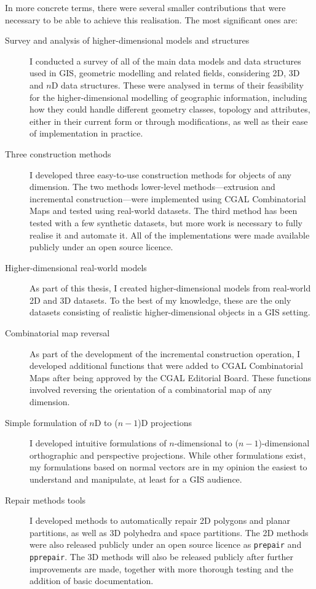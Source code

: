 In more concrete terms, there were several smaller contributions that were necessary to be able to achieve this realisation.
The most significant ones are:

\begin{description}

\item[Survey and analysis of higher-dimensional models and structures] I conducted a survey of all of the main data models and data structures used in GIS, geometric modelling and related fields, considering 2D, 3D and $n$D data structures.
These were analysed in terms of their feasibility for the higher-dimensional modelling of geographic information, including how they could handle different geometry classes, topology and attributes, either in their current form or through modifications, as well as their ease of implementation in practice.

\item[Three construction methods] I developed three easy-to-use construction methods for objects of any dimension.
The two methods lower-level methods---extrusion and incremental construction---were implemented using CGAL Combinatorial Maps and tested using real-world datasets.
The third method has been tested with a few synthetic datasets, but more work is necessary to fully realise it and automate it.
All of the implementations were made available publicly under an open source licence.

\item[Higher-dimensional real-world models] As part of this thesis, I created higher-dimensional models from real-world 2D and 3D datasets.
To the best of my knowledge, these are the only datasets consisting of realistic higher-dimensional objects in a GIS setting.

\item[Combinatorial map reversal] As part of the development of the incremental construction operation, I developed additional functions that were added to CGAL Combinatorial Maps after being approved by the CGAL Editorial Board.
These functions involved reversing the orientation of a combinatorial map of any dimension.

\item[Simple formulation of $n$D to ($n-1$)D projections] I developed intuitive formulations of $n$-dimensional to ($n-1$)-dimensional orthographic and perspective projections.
While other formulations exist, my formulations based on normal vectors are in my opinion the easiest to understand and manipulate, at least for a GIS audience.

\item[Repair methods tools] I developed methods to automatically repair 2D polygons and planar partitions, as well as 3D polyhedra and space partitions.
The 2D methods were also released publicly under an open source licence as \texttt{prepair} and \texttt{pprepair}.
The 3D methods will also be released publicly after further improvements are made, together with more thorough testing and the addition of basic documentation.

\end{description}

